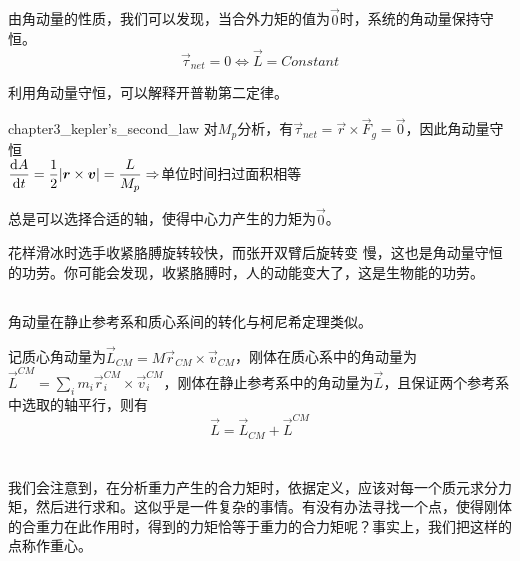 \subsection[角动量守恒]{}
\begin{Itemize}
	\item {}由角动量的性质，我们可以发现，当合外力矩的值为$\vec{0}$时，系统的角动量保持守恒。
	\[\vec{\tau}_{net}=0\Leftrightarrow\vec{L}=Constant\]
\end{Itemize}
利用角动量守恒，可以解释开普勒第二定律。
\begin{singlefigure}{chapter3_kepler's_second_law}
	对$M_p$分析，有$\vec{\tau}_{net}=\vec{r}\times\vec{F}_g=\vec{0}$，因此角动量守恒\\[1ex]
	$\dfrac{\mathrm{d} A}{\mathrm{d} t}=\dfrac{1}{2}|\boldsymbol{r}\times\boldsymbol{v}|=\dfrac{L}{M_p}\Rightarrow$单位时间扫过面积相等
\end{singlefigure}
	
	总是可以选择合适的轴，使得中心力产生的力矩为$\vec{0}$。
	
	花样滑冰时选手收紧胳膊旋转较快，而张开双臂后旋转变
	慢，这也是角动量守恒的功劳。你可能会发现，收紧胳膊时，人的动能变大了，这是生物能的功劳。
\subsection[质心系转化]{}
角动量在静止参考系和质心系间的转化与柯尼希定理类似。
\begin{law}
	记质心角动量为$\vec{L}_{CM}=M\vec{r}_{CM}\times\vec{v}_{CM}$，刚体在质心系中的角动量为$\vec{L}^{CM}=\sum_im_i\vec{r}_i^{CM}\times\vec{v}^{CM}_i$，刚体在静止参考系中的角动量为$\vec{L}$，且保证两个参考系中选取的轴平行，则有
	\[\vec{L}=\vec{L}_{CM}+\vec{L}^{CM}\]
\end{law}
\section[重心]{}
我们会注意到，在分析重力产生的合力矩时，依据定义，应该对每一个质元求分力矩，然后进行求和。这似乎是一件复杂的事情。有没有办法寻找一个点，使得刚体的合重力在此作用时，得到的力矩恰等于重力的合力矩呢？事实上，我们把这样的点称作重心。

